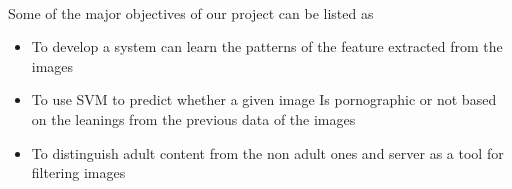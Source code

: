 \documentclass[a4paper,12pt]{report}
\begin{document}
\clearpage
{}\\[1cm]
 Some of the major objectives of our project can be listed as 
\begin{itemize}

\item To develop a system can learn the patterns of the feature extracted from the images
\item To use SVM to predict whether a given image Is pornographic or not based on the leanings from the previous data of the images
\item To distinguish adult content from the non adult ones and server as a tool for filtering images
\end{itemize}










\tableofcontents







%
%
%
%
%
\end{document}
